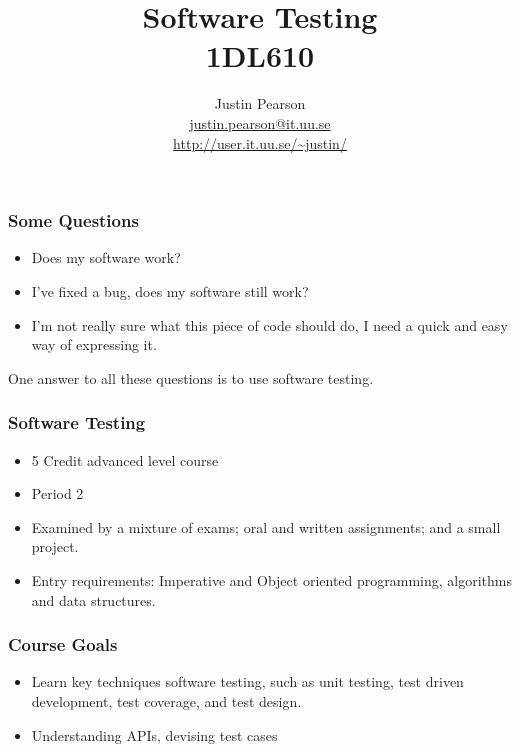 \documentclass{beamer}
\begin{document}
\title{Software Testing \\ 1DL610}
\author{Justin Pearson \\ \url{justin.pearson@it.uu.se} \\ \url{http://user.it.uu.se/~justin/}}
\date{}
\begin{frame}
\maketitle
  
\end{frame}
\begin{frame}
  \frametitle{Some Questions}
  \begin{itemize}
  \item Does my software work?
  \item I've fixed a bug, does my software still work?
  \item I'm not really sure what this piece of code should do, I need
    a quick and easy way of expressing it.
  \end{itemize}
  One answer to all these questions is to use software testing.
\end{frame}
\begin{frame}
  \frametitle{Software Testing}
  \begin{itemize}
  \item 5 Credit advanced level course
  \item Period 2
  \item Examined by a mixture of exams; oral and written
    assignments;  and a small project.
  \item Entry requirements: Imperative and Object oriented
    programming, algorithms and data structures. %
  \end{itemize}
\end{frame}
\begin{frame}
  \frametitle{Course Goals}
  \begin{itemize}
  \item Learn key techniques  software testing, such as unit testing,
    test driven development, test coverage,  and test design.
  \item Understanding APIs, devising test cases 
  \end{itemize}
\end{frame}
\end{document}
